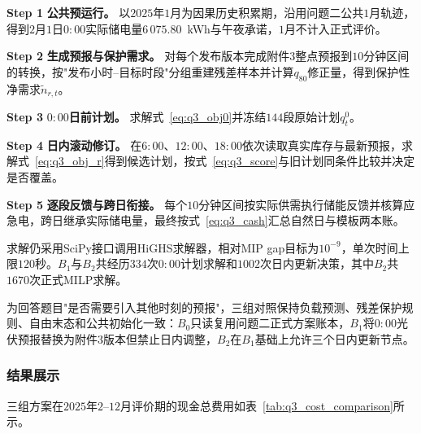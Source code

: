\documentclass[12pt,a4paper]{ctexart}
\theoremstyle{definition}
\theoremstyle{plain}
\theoremstyle{remark}
\newcommand{\step}[1]{\par\noindent\textbf{Step #1}\quad}
\begin{document}
\step{1} \textbf{公共预运行。} 以$2025$年$1$月为因果历史积累期，沿用问题二公共$1$月轨迹，得到$2$月$1$日$0{:}00$实际储电量$6\,075.80$~kWh与午夜承诺，$1$月不计入正式评价。

\step{2} \textbf{生成预报与保护需求。} 对每个发布版本完成附件3整点预报到$10$分钟区间的转换，按"发布小时--目标时段"分组重建残差样本并计算$q_{80}$修正量，得到保护性净需求$\widetilde{n}_{r,t}$。

\step{3} \textbf{$0{:}00$日前计划。} 求解式~\eqref{eq:q3_obj0}并冻结$144$段原始计划$q_t^{0}$。

\step{4} \textbf{日内滚动修订。} 在$6{:}00$、$12{:}00$、$18{:}00$依次读取真实库存与最新预报，求解式~\eqref{eq:q3_obj_r}得到候选计划，按式~\eqref{eq:q3_score}与旧计划同条件比较并决定是否覆盖。

\step{5} \textbf{逐段反馈与跨日衔接。} 每个$10$分钟区间按实际供需执行储能反馈并核算应急电，跨日继承实际储电量，最终按式~\eqref{eq:q3_cash}汇总自然日与模板两本账。

求解仍采用SciPy接口调用HiGHS求解器，相对MIP gap目标为$10^{-9}$，单次时间上限$120$秒。$B_1$与$B_2$共经历$334$次$0{:}00$计划求解和$1002$次日内更新决策，其中$B_2$共$1670$次正式MILP求解。

为回答题目"是否需要引入其他时刻的预报"，三组对照保持负载预测、残差保护规则、自由末态和公共初始化一致：$B_0$只读复用问题二正式方案账本，$B_1$将$0{:}00$光伏预报替换为附件3版本但禁止日内调整，$B_2$在$B_1$基础上允许三个日内更新节点。

\subsubsection{结果展示}

三组方案在$2025$年$2$--$12$月评价期的现金总费用如表~\ref{tab:q3_cost_comparison}所示。

\begin{table}[H]
\centering
\caption{问题三三组方案的全年运行费用与应急指标}
\label{tab:q3_cost_comparison}
\end{table}
\end{document}
